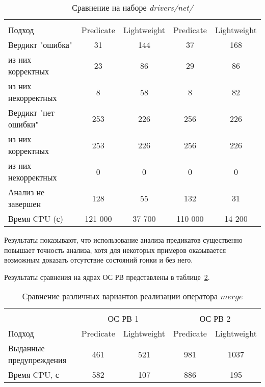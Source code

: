   \begin{table}[h]\footnotesize \centering
    \caption{Сравнение на наборе \textit{drivers/net/}}
  	\label{table-drivers-predicate}
    \begin{tabular}{ | l | c | c | c | c |}
      \hline
      & 			 \multicolumn{2}{c|}{\theoryraces} & 	\multicolumn{2}{c|}{\combatmode}\\
      Подход         				& Predicate & Lightweight 	& Predicate & Lightweight\\ \hline
      Вердикт "ошибка" 				& 31   		& 144   	& 37   		& 168  	\\ 
  \hspace{0.5cm} из них корректных 	& 23 		& 86 		& 29   		& 86 	\\ 
  \hspace{0.5cm} из них некорректных & 8 		& 58 		& 8   		& 82 	\\ \hline
      Вердикт "нет ошибки"  		& 253    	& 226    	& 256   	& 226 	\\ 
  \hspace{0.5cm} из них корректных 	& 253 		& 226    	& 256   	& 226 	\\
  \hspace{0.5cm} из них некорректных & 0 		& 0    		& 0   		& 0 	\\ \hline
      Анализ не завершен       		& 128    	& 55    	& 132   	& 31  	\\ \hline
      Время CPU (с)   				& 121 000 	& 37 700 	& 110 000  	& 14 200\\ 
      \hline
    \end{tabular}
  \end{table}

Результаты показывают, что использование анализа предикатов существенно повышает точность анализа, хотя для некоторых примеров оказывается возможным доказать отсутствие состояний гонки и без него.

Результаты сравнения на ядрах ОС РВ представлены в таблице~\ref{table-os-predicate}.

  \begin{table}[h] \footnotesize \centering
    \caption{Сравнение различных вариантов реализации оператора $merge$}
  	\label{table-os-predicate}
    \begin{tabular}{ | l | c | c | c | c |  }
      \hline
      		& 		\multicolumn{4}{c|}{\combatmode}  \\
      		& 			 \multicolumn{2}{c|}{ОС РВ 1} & 	\multicolumn{2}{c|}{ОС РВ 2}\\
      Подход         					& Predicate  & Lightweight 	& Predicate  & Lightweight 	\\ \hline
      Выданные предупреждения			& 461   	& 521    		& 981   	& 1037  			\\ 
  	  Время CPU, с 						& 582   	& 107  			& 886   	& 195  		\\ 
      \hline
    \end{tabular}
  \end{table}
  
